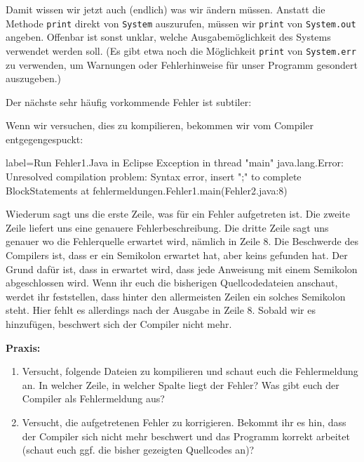 Damit wissen wir jetzt auch (endlich) was wir ändern müssen. Anstatt die
Methode \texttt{print} direkt von \texttt{System} auszurufen, müssen
wir \texttt{print} von \texttt{System.out} angeben. Offenbar ist sonst unklar,
welche Ausgabemöglichkeit des Systems verwendet werden soll. (Es gibt etwa noch
die Möglichkeit \texttt{print} von \texttt{System.err} zu verwenden, um
Warnungen oder Fehlerhinweise für unser Programm gesondert auszugeben.)

Der nächste sehr häufig vorkommende Fehler ist subtiler:


Wenn wir versuchen, dies zu kompilieren, bekommen wir vom Compiler
entgegengespuckt:

{\small
\begin{textcode*}{label=Run Fehler1.Java in Eclipse}
Exception in thread "main" java.lang.Error: Unresolved compilation problem:
  Syntax error, insert ";" to complete BlockStatements
  at fehlermeldungen.Fehler1.main(Fehler2.java:8)
\end{textcode*}
}

Wiederum sagt uns die erste Zeile, was für ein Fehler aufgetreten ist. Die
zweite Zeile liefert uns eine genauere Fehlerbeschreibung. Die dritte Zeile sagt
uns genauer wo die Fehlerquelle erwartet wird, nämlich in Zeile 8. Die
Beschwerde des Compilers ist, dass er ein Semikolon erwartet hat, aber keins
gefunden hat. Der Grund dafür ist, dass in \Java erwartet wird, dass jede
Anweisung mit einem Semikolon abgeschlossen wird. Wenn ihr euch die bisherigen
Quellcodedateien anschaut, werdet ihr feststellen, dass hinter den allermeisten
Zeilen ein solches Semikolon steht. Hier fehlt es allerdings nach der Ausgabe in
Zeile 8. Sobald wir es hinzufügen, beschwert sich der Compiler nicht mehr.

\textbf{Praxis:}
\begin{enumerate}
\item Versucht, folgende Dateien zu kompilieren und schaut euch die
  Fehlermeldung an. In welcher Zeile, in welcher Spalte liegt der Fehler? Was
  gibt euch der Compiler als Fehlermeldung aus?
\item Versucht, die aufgetretenen Fehler zu korrigieren. Bekommt ihr es hin,
  dass der Compiler sich nicht mehr beschwert und das Programm korrekt arbeitet
  (schaut euch ggf. die bisher gezeigten Quellcodes an)?
\end{enumerate}

